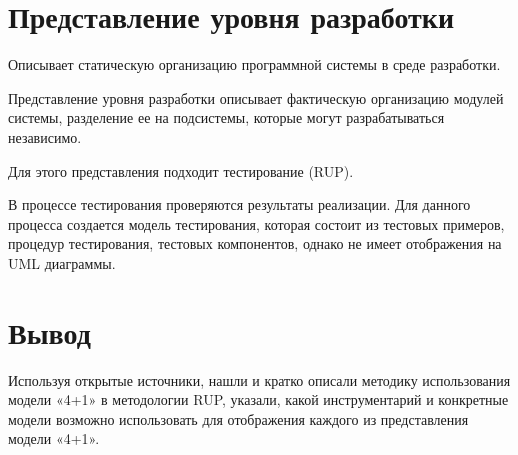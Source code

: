 \section{Представление уровня разработки}

Описывает статическую организацию программной системы в среде разработки.

Представление уровня разработки описывает фактическую организацию модулей системы, разделение ее на подсистемы, которые могут разрабатываться независимо.

Для этого представления подходит тестирование (RUP).

В процессе тестирования проверяются результаты реализации. Для данного процесса создается модель тестирования, которая состоит из тестовых примеров, процедур тестирования, тестовых компонентов, однако не имеет отображения на UML диаграммы.

\section{Вывод}

Используя открытые источники, нашли и кратко описали методику использования модели «4+1» в методологии RUP, указали, какой инструментарий и конкретные модели возможно использовать для отображения каждого из представления модели «4+1».

